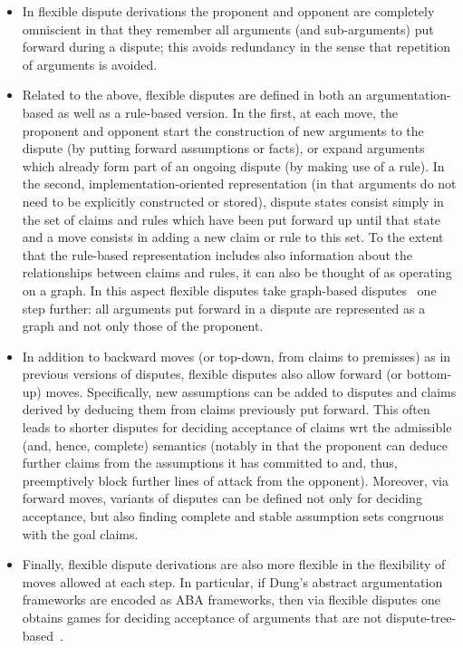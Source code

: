 \documentclass[conference]{IEEEtran}
\begin{document}
\begin{itemize}
\item In flexible dispute derivations the proponent and opponent are completely omniscient in that they remember all arguments (and sub-arguments) put forward during a dispute; this avoids redundancy in the sense that repetition of arguments is avoided.    
\item Related to the above, flexible disputes are defined in both an argumentation-based as well as a rule-based version.  In the first, at each move, the proponent and opponent start the construction of new arguments to the dispute (by putting forward assumptions or facts), or expand arguments which already form part of an ongoing dispute (by making use of a rule).  In the second, implementation-oriented representation (in that arguments do not need to be explicitly constructed or stored), dispute states consist simply in the set of claims and rules which have been put forward up until that state and a move consists in adding a new claim or rule to this set.   To the extent that the rule-based representation includes also information about the relationships between claims and rules, it can also be thought of as operating on a graph.  In this aspect flexible disputes take graph-based disputes~\cite{CravenT16} one step further: all arguments put forward in a dispute are represented as a graph and not only those of the proponent.
\item In addition to backward moves (or top-down, from claims to premisses) as in previous versions of disputes, flexible disputes also allow forward (or bottom-up) moves.  Specifically, new assumptions can be added to disputes and claims derived by deducing them from claims previously put forward.  This often leads to shorter disputes for deciding acceptance of claims wrt the admissible (and, hence, complete) semantics (notably in that the proponent can deduce further claims from the assumptions it has committed to and, thus, preemptively block further lines of attack from the opponent). Moreover, via forward moves, variants of disputes can be defined not only for deciding acceptance, but also finding complete and stable assumption sets congruous with the goal claims.
\item Finally, flexible dispute derivations are also more flexible in the flexibility of moves allowed at each step.  In particular, if Dung's abstract argumentation frameworks are encoded as ABA frameworks, then via flexible disputes one obtains games for deciding acceptance of arguments that are not dispute-tree-based~\cite{Caminada18}.
\end{itemize}
\end{document}
